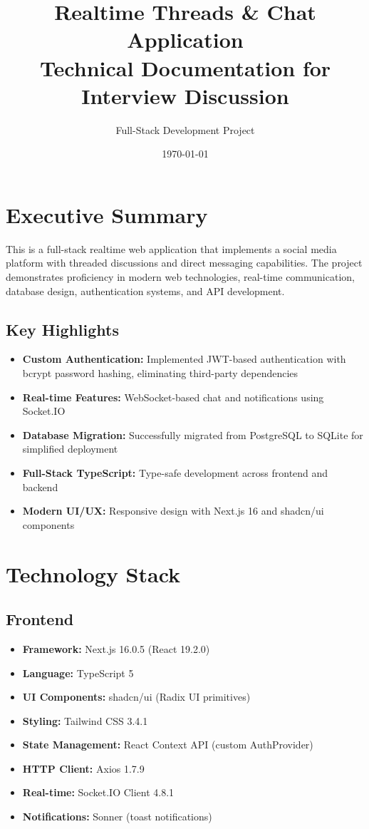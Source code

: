 \documentclass[11pt,a4paper]{article}
\title{\textbf{Realtime Threads \& Chat Application}\\
\large Technical Documentation for Interview Discussion}
\author{Full-Stack Development Project}
\date{\today}
\begin{document}
\maketitle
\tableofcontents
\newpage

\section{Executive Summary}

This is a full-stack realtime web application that implements a social media platform with threaded discussions and direct messaging capabilities. The project demonstrates proficiency in modern web technologies, real-time communication, database design, authentication systems, and API development.

\subsection{Key Highlights}
\begin{itemize}[leftmargin=*]
    \item \textbf{Custom Authentication:} Implemented JWT-based authentication with bcrypt password hashing, eliminating third-party dependencies
    \item \textbf{Real-time Features:} WebSocket-based chat and notifications using Socket.IO
    \item \textbf{Database Migration:} Successfully migrated from PostgreSQL to SQLite for simplified deployment
    \item \textbf{Full-Stack TypeScript:} Type-safe development across frontend and backend
    \item \textbf{Modern UI/UX:} Responsive design with Next.js 16 and shadcn/ui components
\end{itemize}

\section{Technology Stack}

\subsection{Frontend}
\begin{itemize}[leftmargin=*]
    \item \textbf{Framework:} Next.js 16.0.5 (React 19.2.0)
    \item \textbf{Language:} TypeScript 5
    \item \textbf{UI Components:} shadcn/ui (Radix UI primitives)
    \item \textbf{Styling:} Tailwind CSS 3.4.1
    \item \textbf{State Management:} React Context API (custom AuthProvider)
    \item \textbf{HTTP Client:} Axios 1.7.9
    \item \textbf{Real-time:} Socket.IO Client 4.8.1
    \item \textbf{Notifications:} Sonner (toast notifications)
\end{itemize}
\end{document}
